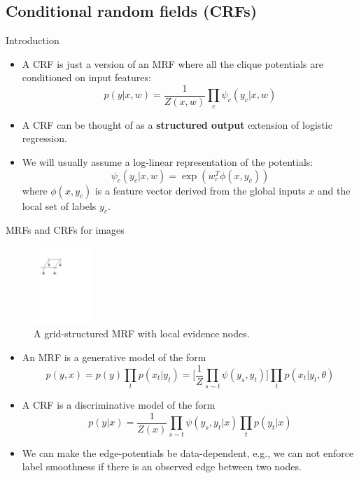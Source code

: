 \documentclass[10pt,mathserif]{beamer}
\begin{document}
\subsection{Conditional random fields (CRFs)}
\begin{frame}{Introduction}
\begin{itemize}
    \item A CRF is just a version of an MRF where all the clique potentials are conditioned on input features:
    \begin{equation}
        p(y|x,w) = \frac{1}{Z(x,w)}\prod_c\psi_c(y_c|x,w) 
    \end{equation}
    
    \item A CRF can be thought of as a \textbf{structured output} extension of logistic regression.
    
    \item We will usually assume a log-linear representation of the potentials:
    \begin{equation}
        \psi_c (y_c |x, w) = \exp(w_c^T \phi(x, y_c ))
    \end{equation}
    where $\phi(x, y_c )$ is a feature vector derived from the global inputs $x$ and the local set of labels $y_c$.
\end{itemize}
\end{frame}

        \begin{frame}{MRFs and CRFs for images}
        \begin{figure}[h]
        \centering
        \includegraphics[width=0.2\textwidth]{chaingraphLatticeXY}
        \caption{A grid-structured MRF with local evidence nodes.}
        \end{figure}

\begin{itemize}
    \item An MRF is a generative model of the form 
    \begin{equation}
        p(y,x)=p(y) \prod_t p(x_t|y_t)= \bigg[\frac{1}{Z}\prod_{s\sim t} \psi(y_s,y_t)\bigg] \prod_t p(x_t|y_t,\theta)
    \end{equation}
    
    \item A CRF is a discriminative model of the form
    \begin{equation}
        p(y|x) = \frac{1}{Z(x)} \prod_{s\sim t} \psi(y_s,y_t|x)\prod_t p(y_t|x)
    \end{equation}
    \item We can make the edge-potentials be data-dependent, e.g., we can not enforce label smoothness if there is an observed edge between two nodes.
\end{itemize}
\end{frame}
\end{document}
